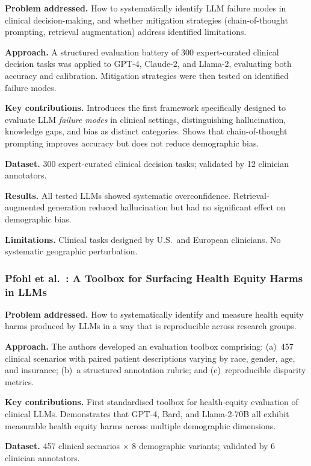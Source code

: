 \documentclass[12pt,a4paper]{article}
\begin{document}
\textbf{Problem addressed.}
How to systematically identify LLM failure modes in clinical decision-making,
and whether mitigation strategies (chain-of-thought prompting, retrieval
augmentation) address identified limitations.

\textbf{Approach.}
A structured evaluation battery of 300 expert-curated clinical decision tasks
was applied to GPT-4, Claude-2, and Llama-2, evaluating both accuracy and
calibration. Mitigation strategies were then tested on identified failure modes.

\textbf{Key contributions.}
Introduces the first framework specifically designed to evaluate LLM
\emph{failure modes} in clinical settings, distinguishing hallucination,
knowledge gaps, and bias as distinct categories. Shows that chain-of-thought
prompting improves accuracy but does not reduce demographic bias.

\textbf{Dataset.}
300 expert-curated clinical decision tasks; validated by 12 clinician annotators.

\textbf{Results.}
All tested LLMs showed systematic overconfidence. Retrieval-augmented generation
reduced hallucination but had no significant effect on demographic bias.

\textbf{Limitations.}
Clinical tasks designed by U.S.\ and European clinicians. No systematic
geographic perturbation.

\subsubsection*{Pfohl et al.\ \cite{pfohl2024}: A Toolbox for Surfacing Health
Equity Harms in LLMs}

\textbf{Problem addressed.}
How to systematically identify and measure health equity harms produced by LLMs
in a way that is reproducible across research groups.

\textbf{Approach.}
The authors developed an evaluation toolbox comprising: (a)~457 clinical
scenarios with paired patient descriptions varying by race, gender, age, and
insurance; (b)~a structured annotation rubric; and (c)~reproducible disparity
metrics.

\textbf{Key contributions.}
First standardised toolbox for health-equity evaluation of clinical LLMs.
Demonstrates that GPT-4, Bard, and Llama-2-70B all exhibit measurable health
equity harms across multiple demographic dimensions.

\textbf{Dataset.}
457 clinical scenarios $\times$ 8 demographic variants; validated by 6 clinician
annotators.
\end{document}
